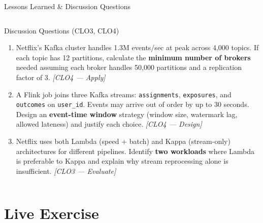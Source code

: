 \documentclass[aspectratio=169,10pt]{beamer}
\begin{document}
\begin{frame}{Lessons Learned \& Discussion Questions}
\begin{columns}[T]
      \begin{alertblock}{Discussion Questions \textmd{\tiny (CLO3, CLO4)}}
        \begin{enumerate}
          \item Netflix's Kafka cluster handles 1.3M events/sec at peak
                across 4{,}000 topics.
                If each topic has 12 partitions, calculate the
                \textbf{minimum number of brokers} needed assuming
                each broker handles 50{,}000 partitions and a
                replication factor of 3.
                \textit{[CLO4 — Apply]}
          \item A Flink job joins three Kafka streams:
                \texttt{assignments}, \texttt{exposures}, and
                \texttt{outcomes} on \texttt{user\_id}.
                Events may arrive out of order by up to 30 seconds.
                Design an \textbf{event-time window} strategy
                (window size, watermark lag, allowed lateness)
                and justify each choice.
                \textit{[CLO4 — Design]}
          \item Netflix uses both Lambda (speed + batch) and Kappa
                (stream-only) architectures for different pipelines.
                Identify \textbf{two workloads} where Lambda is
                preferable to Kappa and explain why stream reprocessing
                alone is insufficient.
                \textit{[CLO3 — Evaluate]}
        \end{enumerate}
      \end{alertblock}
  \end{columns}
\end{frame}

\section{Live Exercise}
\end{document}
